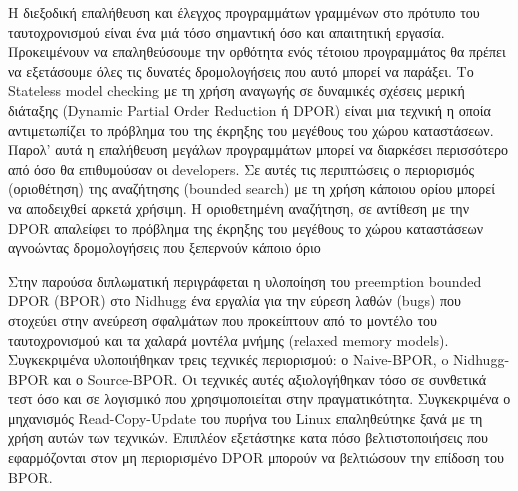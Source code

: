 H διεξοδική επαλήθευση και έλεγχος προγραμμάτων γραμμένων στο πρότυπο του ταυτοχρονισμού είναι ένα μιά τόσο σημαντική
όσο και απαιτητική εργασία. Προκειμένουν να επαληθεύσουμε την ορθότητα ενός τέτοιου προγραμμάτος θα πρέπει να εξετάσουμε
όλες τις δυνατές δρομολογήσεις που αυτό μπορεί να παράξει. Το Stateless model checking με τη χρήση αναγωγής σε δυναμικές
σχέσεις μερική διάταξης (Dynamic Partial Order Reduction ή DPOR) είναι μια τεχνική η οποία αντιμετωπίζει το πρόβλημα του της
έκρηξης του μεγέθους του χώρου καταστάσεων. Παρολ' αυτά η επαλήθευση μεγάλων προγραμμάτων μπορεί να διαρκέσει
περισσότερο από όσο θα επιθυμούσαν οι developers. Σε αυτές τις περιπτώσεις ο περιορισμός (οριοθέτηση) της αναζήτησης
(bounded search) με τη χρήση κάποιου ορίου μπορεί να αποδειχθεί αρκετά χρήσιμη. Η οριοθετημένη αναζήτηση, σε αντίθεση με την DPOR 
απαλείφει το πρόβλημα της έκρηξης του μεγέθους το χώρου καταστάσεων αγνοώντας δρομολογήσεις που ξεπερνούν κάποιο όριο

Στην παρούσα διπλωματική περιγράφεται η υλοποίηση του preemption bounded DPOR (BPOR) στο Nidhugg ένα εργαλία για την εύρεση λαθών (bugs)
που στοχεύει στην ανεύρεση σφαλμάτων που προκείπτουν από το μοντέλο του ταυτοχρονισμού και τα χαλαρά μοντέλα μνήμης (relaxed memory models).
Συγκεκριμένα υλοποιήθηκαν τρεις τεχνικές περιορισμού: ο Naive-BPOR, o Nidhugg-BPOR και ο Source-BPOR. Οι τεχνικές αυτές αξιολογήθηκαν τόσο σε 
συνθετικά τεστ όσο και σε λογισμικό που χρησιμοποιείται στην πραγματικότητα. Συγκεκριμένα ο μηχανισμός Read-Copy-Update του πυρήνα του Linux
επαληθεύτηκε ξανά με τη χρήση αυτών των τεχνικών. Επιπλέον εξετάστηκε κατα πόσο βελτιστοποιήσεις που εφαρμόζονται στον μη περιορισμένο DPOR μπορούν
να βελτιώσουν την επίδοση του BPOR.